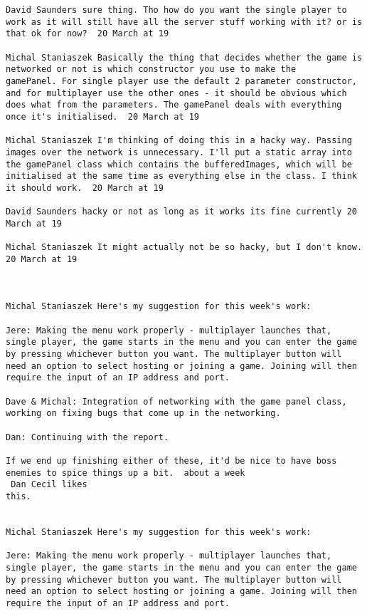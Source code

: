 \documentclass[10pt]{report}
\begin{document}
\begin{verbatim}
David Saunders sure thing. Tho how do you want the single player to
work as it will still have all the server stuff working with it? or is
that ok for now?  20 March at 19

Michal Staniaszek Basically the thing that decides whether the game is
networked or not is which constructor you use to make the
gamePanel. For single player use the default 2 parameter constructor,
and for multiplayer use the other ones - it should be obvious which
does what from the parameters. The gamePanel deals with everything
once it's initialised.  20 March at 19

Michal Staniaszek I'm thinking of doing this in a hacky way. Passing
images over the network is unnecessary. I'll put a static array into
the gamePanel class which contains the bufferedImages, which will be
initialised at the same time as everything else in the class. I think
it should work.  20 March at 19

David Saunders hacky or not as long as it works its fine currently 20
March at 19

Michal Staniaszek It might actually not be so hacky, but I don't know.
20 March at 19



Michal Staniaszek Here's my suggestion for this week's work:

Jere: Making the menu work properly - multiplayer launches that,
single player, the game starts in the menu and you can enter the game
by pressing whichever button you want. The multiplayer button will
need an option to select hosting or joining a game. Joining will then
require the input of an IP address and port.

Dave & Michal: Integration of networking with the game panel class,
working on fixing bugs that come up in the networking.

Dan: Continuing with the report.

If we end up finishing either of these, it'd be nice to have boss
enemies to spice things up a bit.  about a week 
 Dan Cecil likes
this.


Michal Staniaszek Here's my suggestion for this week's work:

Jere: Making the menu work properly - multiplayer launches that,
single player, the game starts in the menu and you can enter the game
by pressing whichever button you want. The multiplayer button will
need an option to select hosting or joining a game. Joining will then
require the input of an IP address and port.


\end{verbatim}
\end{document}
